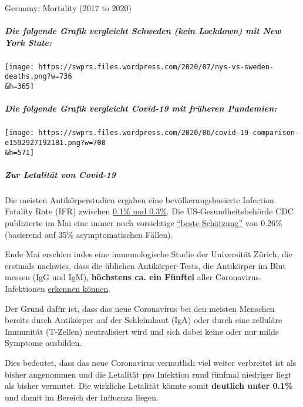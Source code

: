 Germany: Mortality (2017 to 2020)

\hypertarget{die-folgende-grafik-vergleicht-schweden-kein-lockdown-mit-new-york-state}{%
\subparagraph{Die folgende Grafik vergleicht Schweden (kein Lockdown)
mit New York
State:}\label{die-folgende-grafik-vergleicht-schweden-kein-lockdown-mit-new-york-state}}

\texttt{[image: https://swprs.files.wordpress.com/2020/07/nys-vs-sweden-deaths.png?w=736\\\&h=365]}

\hypertarget{die-folgende-grafik-vergleicht-covid-19-mit-fruxfcheren-pandemien}{%
\subparagraph{Die folgende Grafik vergleicht Covid-19 mit früheren
Pandemien:}\label{die-folgende-grafik-vergleicht-covid-19-mit-fruxfcheren-pandemien}}

\texttt{[image: https://swprs.files.wordpress.com/2020/06/covid-19-comparison-e1592927192181.png?w=700\\\&h=571]}

\hypertarget{zur-letalituxe4t-von-covid-19}{%
\subparagraph{\texorpdfstring{\textbf{Zur Letalität von
Covid-19}}{Zur Letalität von Covid-19}}\label{zur-letalituxe4t-von-covid-19}}

Die meisten Antikörperstudien ergaben eine bevölkerungsbasierte
Infection Fatality Rate (IFR) zwischen
\href{https://swprs.org/studies-on-covid-19-lethality/}{0.1\% und
0.3\%}. Die US-Gesundheitsbehörde CDC publizierte im Mai eine immer noch
vorsichtige
\href{https://reason.com/2020/05/24/the-cdcs-new-best-estimate-implies-a-covid-19-infection-fatality-rate-below-0-3/}{``beste
Schätzung''} von 0.26\% (basierend auf 35\% asymptomatischen Fällen).

Ende Mai erschien indes eine immunologische Studie der Universität
Zürich, die erstmals nachwies, dass die üblichen Antikörper-Tests, die
Antikörper im Blut messen (IgG und IgM), \textbf{höchstens ca. ein
Fünftel} aller Coronavirus-Infektionen
\href{https://swprs.org/coronavirus-antibody-tests-show-only-one-fifth-of-infections/}{erkennen
können}.

Der Grund dafür ist, dass das neue Coronavirus bei den meisten Menschen
bereits durch Antikörper auf der Schleimhaut (IgA) oder durch eine
zelluläre Immunität (T-Zellen) neutralisiert wird und sich dabei keine
oder nur milde Symptome ausbilden.

Dies bedeutet, dass das neue Coronavirus vermutlich viel weiter
verbreitet ist als bisher angenommen und die Letalität pro Infektion
rund fünfmal niedriger liegt als bisher vermutet. Die wirkliche
Letalität könnte somit \textbf{deutlich unter 0.1\%} und damit im
Bereich der Influenza liegen.

